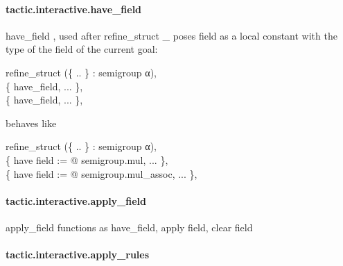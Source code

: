 \documentclass{article}
\begin{document}
\paragraph{tactic.interactive.have\_field}
\par
\colorbox[RGB]{253,246,227}{{{{\color[RGB]{101, 123, 131} have\_field }}}}, used after 
\colorbox[RGB]{253,246,227}{{{{\color[RGB]{101, 123, 131} refine\_struct \_ }}}} poses 
\colorbox[RGB]{253,246,227}{{{{\color[RGB]{101, 123, 131} field }}}} as a local constant
with the type of the field of the current goal:
\\
\colorbox[RGB]{253,246,227}{\parbox{4.5in}{{{{\color[RGB]{101, 123, 131} refine\_struct (\{ .. \} : semigroup α),
 }}}\\
{{{\color[RGB]{101, 123, 131} \{ have\_field, ... \},
 }}}\\
{{{\color[RGB]{101, 123, 131} \{ have\_field, ... \},
 }}}\\

}}\par
behaves like
\\
\colorbox[RGB]{253,246,227}{\parbox{4.5in}{{{{\color[RGB]{101, 123, 131} refine\_struct (\{ .. \} : semigroup α),
 }}}\\
{{{\color[RGB]{101, 123, 131} \{  }}}{{{\color[RGB]{133, 153, 0} have }}}{{{\color[RGB]{101, 123, 131}  field  }}}{{{\color[RGB]{181, 137, 0} := }}}{{{\color[RGB]{101, 123, 131}   }}}{{{\color[RGB]{181, 137, 0} @ }}}{{{\color[RGB]{101, 123, 131} semigroup.mul, ... \},
 }}}\\
{{{\color[RGB]{101, 123, 131} \{  }}}{{{\color[RGB]{133, 153, 0} have }}}{{{\color[RGB]{101, 123, 131}  field  }}}{{{\color[RGB]{181, 137, 0} := }}}{{{\color[RGB]{101, 123, 131}   }}}{{{\color[RGB]{181, 137, 0} @ }}}{{{\color[RGB]{101, 123, 131} semigroup.mul\_assoc, ... \},
 }}}\\

}}\paragraph{tactic.interactive.apply\_field}
\par
\colorbox[RGB]{253,246,227}{{{{\color[RGB]{101, 123, 131} apply\_field }}}} functions as 
\colorbox[RGB]{253,246,227}{{{{\color[RGB]{101, 123, 131} have\_field, apply field, clear field }}}}\paragraph{tactic.interactive.apply\_rules}
\par
\end{document}
